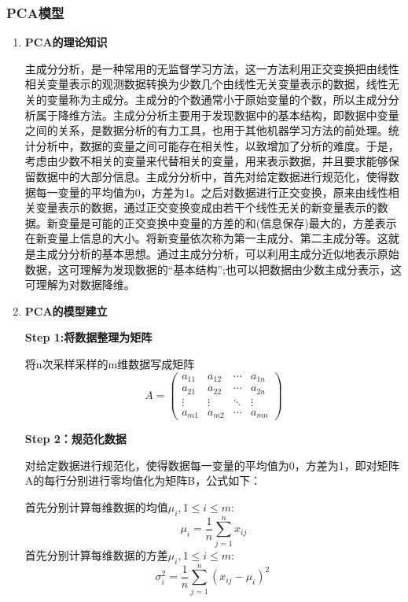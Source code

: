 \documentclass[a4paper]{article}
\begin{document}
	\subsubsection{PCA模型}
	\begin{enumerate}[itemindent=1cm,leftmargin=0em,label=(\Roman*)]
		\item \textbf{PCA的理论知识}
		
		\quad \quad 主成分分析，是一种常用的无监督学习方法，这一方法利用正交变换把由线性相关变量表示的观测数据转换为少数几个由线性无关变量表示的数据，线性无关的变量称为主成分。主成分的个数通常小于原始变量的个数，所以主成分分析属于降维方法。主成分分析主要用于发现数据中的基本结构，即数据中变量之间的关系，是数据分析的有力工具，也用于其他机器学习方法的前处理。统计分析中，数据的变量之间可能存在相关性，以致增加了分析的难度。于是，考虑由少数不相关的变量来代替相关的变量，用来表示数据，并且要求能够保留数据中的大部分信息。主成分分析中，首先对给定数据进行规范化，使得数据每一变量的平均值为0，方差为1。之后对数据进行正交变换，原来由线性相关变量表示的数据，通过正交变换变成由若干个线性无关的新变量表示的数据。新变量是可能的正交变换中变量的方差的和(信息保存)最大的，方差表示在新变量上信息的大小。将新变量依次称为第一主成分、第二主成分等。这就是主成分分析的基本思想。通过主成分分析，可以利用主成分近似地表示原始数据，这可理解为发现数据的“基本结构”;也可以把数据由少数主成分表示，这可理解为对数据降维。
		\item \textbf{PCA的模型建立}		
		
		\textbf{Step 1:将数据整理为矩阵}
		
		将n次采样采样的m维数据写成矩阵
		\begin{equation}  
			A =
			\begin{pmatrix}  
				a_{11} & a_{12} & \cdots & a_{1n} \\  
				a_{21} & a_{22} & \cdots & a_{2n} \\  
				\vdots & \vdots & \ddots & \vdots \\  
				a_{m1} & a_{m2} & \cdots & a_{mn}  
			\end{pmatrix}  
		\end{equation} 
		
		\textbf{Step 2：规范化数据}
		
		对给定数据进行规范化，使得数据每一变量的平均值为0，方差为1，即对矩阵A的每行分别进行零均值化为矩阵B，公式如下：
		
		首先分别计算每维数据的均值$\mu_{i},1\leq i\leq m$:
		\begin{equation}  
	    \mu_{i} = \frac{1}{n} \sum_{j=1}^{n} x_{ij}
		\end{equation} 
		首先分别计算每维数据的方差$\mu_{i},1\leq i\leq m$:
		\begin{equation}  
		 \sigma_{i}^2 = \frac{1}{n} \sum_{j=1}^{n} (x_{ij} - \mu_{i})^2 \   
	    \end{equation} 
		

\end{enumerate}
\end{document}
